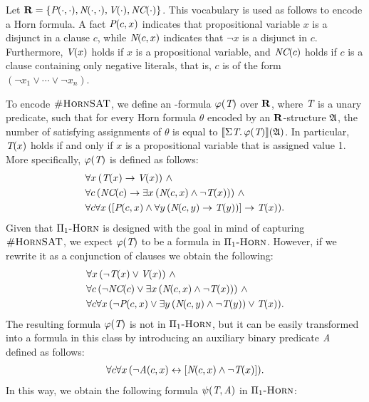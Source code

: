 \begin{example} \label{ex-hornsat-esop1}
Let $\mathbf{R} = \{\textit{P}(\cdot,\cdot), \textit{N}(\cdot,\cdot), \textit{V}(\cdot), \textit{NC}(\cdot)\}$. This vocabulary is used as follows to encode a Horn formula. A fact $\textit{P}(c,x)$ indicates that propositional variable $x$ is a disjunct in a clause $c$, while $\textit{N}(c,x)$ indicates that $\neg x$ is a disjunct in $c$. Furthermore, $\textit{V}(x)$ holds if  $x$ is a propositional variable, and $\textit{NC}(c)$ holds if $c$ is a clause containing only negative literals, that is, $c$ is of the form $(\neg x_1 \vee \cdots \vee \neg x_n)$.

To encode $\textsc{\#HornSAT}$, we define an \so-formula $\varphi(\textit{T})$ over $\mathbf{R}$, where $\textit{T}$ is a unary predicate, such that for every Horn formula $\theta$ encoded by an $\mathbf{R}$-structure $\mathfrak{A}$, the number of satisfying assignments of $\theta$ is equal to ${\llbracket{}{\Sigma{\textit{T}}.\, \varphi(\textit{T})}\rrbracket}(\mathfrak{A})$. In particular, $\textit{T}(x)$ holds if and only if $x$ is a propositional variable that is assigned value 1.  More specifically, $\varphi(\textit{T})$ is defined as follows:
\begin{align*}
&\forall x \, (\textit{T}(x) \to \textit{V}(x)) \ \wedge\\
&\forall c \, (\textit{NC}(c) \to \exists x \, (\textit{N}(c,x) \wedge \neg \textit{T}(x))) \ \wedge\\
&\forall c \forall x \, ([\textit{P}(c,x) \wedge \forall y \, (\textit{N}(c,y) \to \textit{T}(y))] \to \textit{T}(x)).
\end{align*}
Given that $\Pi_1\textsc{-Horn}$ is designed with the goal in mind of capturing $\textsc{\#HornSAT}$, we expect $\varphi(\textit{T})$ to be a formula in $\Pi_1\textsc{-Horn}$. However, if we rewrite it as a conjunction of clauses we obtain the following:
\begin{align*}
&\forall x \, (\neg \textit{T}(x) \vee \textit{V}(x)) \ \wedge\\
&\forall c \, (\neg \textit{NC}(c) \vee \exists x \, (\textit{N}(c,x) \wedge \neg \textit{T}(x)))\ \wedge\\
&\forall c \forall x \, (\neg \textit{P}(c,x) \vee \exists y \, (\textit{N}(c,y) \wedge \neg \textit{T}(y)) \vee \textit{T}(x)).
\end{align*}
The resulting formula $\varphi(\textit{T})$ is not in $\Pi_1\textsc{-Horn}$, but it can be easily transformed into a formula in this class  by introducing an auxiliary binary predicate $\textit{A}$ defined as follows:
\begin{align*}
\forall c \forall x \, (\neg \textit{A}(c,x) \leftrightarrow [\textit{N}(c,x) \wedge \neg \textit{T}(x)]).
\end{align*}
In this way, we obtain the following formula $\psi(\textit{T},\textit{A})$ in $\Pi_1\textsc{-Horn}$:
\begin{align*}

\end{align*}
\end{example}
